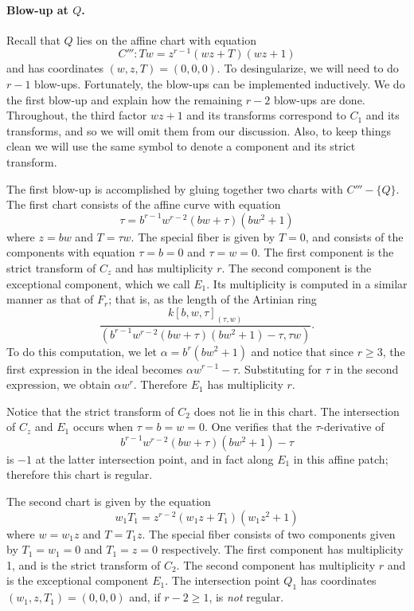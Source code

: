 \documentclass{article}
\theoremstyle{plain}
\theoremstyle{definition}
\theoremstyle{remark}
\begin{document}
\paragraph{Blow-up at $Q$.}
\label{sec:blow-up-Q}

Recall that $Q$ lies on the affine chart with equation
\begin{equation}
  C''':Tw = z^{r-1}(wz + T)(wz + 1)\label{eq:C'''}
\end{equation}
and has coordinates $(w,z,T) = (0,0,0)$. To desingularize, we will need to do $r-1$ blow-ups. Fortunately, the blow-ups can be implemented inductively. We do the first blow-up and explain how the remaining $r-2$ blow-ups are done. Throughout, the third factor $wz + 1$ and its transforms correspond to $C_1$ and its transforms, and so we will omit them from our discussion. Also, to keep things clean we will use the same symbol to denote a component and its strict transform.

The first blow-up is accomplished by gluing together two charts with $C'''-\{Q\}$. The first chart consists of the affine curve with equation
\[
\tau = b^{r-1} w^{r-2} (bw + \tau) (b w^2 + 1)
\]
where $z = bw$ and $T = \tau w$. The special fiber is given by $T = 0$, and consists of the components with equation $\tau = b = 0$ and $\tau = w = 0$. The first component is the strict transform of ${C_z}$ and has multiplicity $r$. The second component is the exceptional component, which we call $E_1$. Its multiplicity is computed in a similar manner as that of $F_r$; that is, as the length of the Artinian ring
\[
\frac{k[b,w,\tau]_{(\tau, w)}}{(b^{r-1}w^{r-2}(bw + \tau)(bw^2 + 1) - \tau, \tau w)}.
\]
To do this computation, we let $\alpha = b^r(bw^2 + 1)$ and notice that since $r \geq 3$, the first expression in the ideal becomes $\alpha w^{r-1} - \tau$. Substituting for $\tau$ in the second expression, we obtain $\alpha w^r$. Therefore $E_1$ has multiplicity $r$.

Notice that the strict transform of $C_2$ does not lie in this chart. The intersection of $C_z$ and $E_1$ occurs when $\tau = b = w = 0$. One verifies that the $\tau$-derivative of 
\[
b^{r-1}w^{r-2}(bw + \tau)(bw^2 + 1) - \tau
\]
is $-1$ at the latter intersection point, and in fact along $E_1$ in this affine patch; therefore this chart is regular.

The second chart is given by the equation
\[
w_1 T_1 = z^{r-2}(w_1z + T_1)(w_1 z^2 + 1)
\]
where $w = w_1 z$ and $T = T_1 z$. The special fiber consists of two components given by $T_1 = w_1 = 0$ and $T_1 = z = 0$ respectively. The first component has multiplicity 1, and is the strict transform of $C_2$. The second component has multiplicity $r$ and is the exceptional component $E_{1}$. The intersection point $Q_1$ has coordinates $(w_1, z, T_1) = (0,0,0)$ and, if $r - 2 \geq 1$, is \emph{not} regular.
\end{document}
